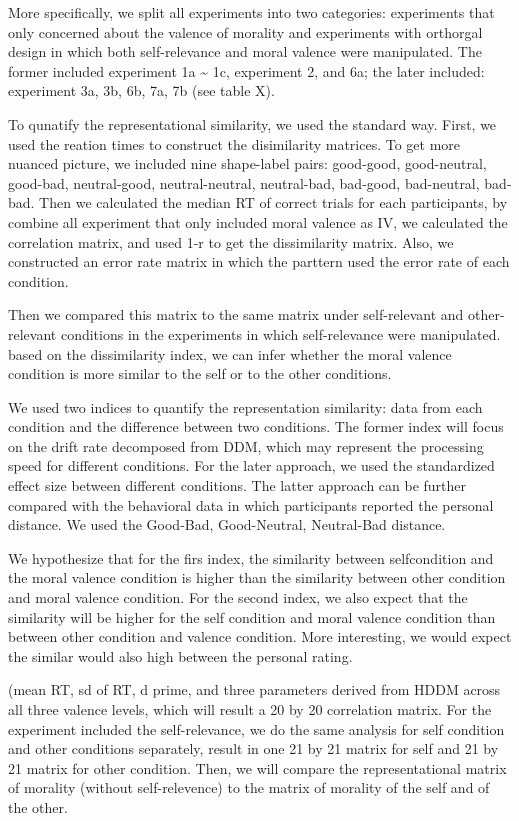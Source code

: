 \documentclass[man]{apa6}
\begin{document}
More specifically, we split all experiments into two categories: experiments that only concerned about the valence of morality and experiments with orthorgal design in which both self-relevance and moral valence were manipulated. The former included experiment 1a \textasciitilde{} 1c, experiment 2, and 6a; the later included: experiment 3a, 3b, 6b, 7a, 7b (see table X).

To qunatify the representational similarity, we used the standard way. First, we used the reation times to construct the disimilarity matrices. To get more nuanced picture, we included nine shape-label pairs: good-good, good-neutral, good-bad, neutral-good, neutral-neutral, neutral-bad, bad-good, bad-neutral, bad-bad. Then we calculated the median RT of correct trials for each participants, by combine all experiment that only included moral valence as IV, we calculated the correlation matrix, and used 1-r to get the dissimilarity matrix. Also, we constructed an error rate matrix in which the parttern used the error rate of each condition.

Then we compared this matrix to the same matrix under self-relevant and other-relevant conditions in the experiments in which self-relevance were manipulated. based on the dissimilarity index, we can infer whether the moral valence condition is more similar to the self or to the other conditions.

We used two indices to quantify the representation similarity: data from each condition and the difference between two conditions. The former index will focus on the drift rate decomposed from DDM, which may represent the processing speed for different conditions. For the later approach, we used the standardized effect size between different conditions. The latter approach can be further compared with the behavioral data in which participants reported the personal distance. We used the Good-Bad, Good-Neutral, Neutral-Bad distance.

We hypothesize that for the firs index, the similarity between selfcondition and the moral valence condition is higher than the similarity between other condition and moral valence condition. For the second index, we also expect that the similarity will be higher for the self condition and moral valence condition than between other condition and valence condition. More interesting, we would expect the similar would also high between the personal rating.

(mean RT, sd of RT, d prime, and three parameters derived from HDDM across all three valence levels, which will result a 20 by 20 correlation matrix. For the experiment included the self-relevance, we do the same analysis for self condition and other conditions separately, result in one 21 by 21 matrix for self and 21 by 21 matrix for other condition. Then, we will compare the representational matrix of morality (without self-relevence) to the matrix of morality of the self and of the other.
\end{document}
